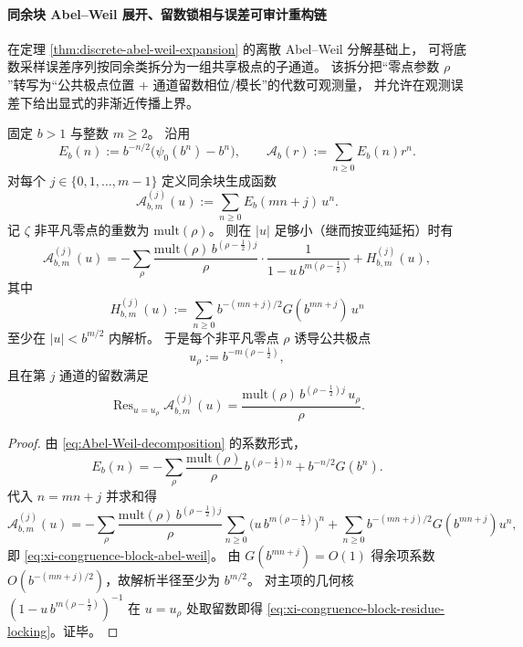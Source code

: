 \paragraph{同余块 Abel--Weil 展开、留数锁相与误差可审计重构链}\label{par:xi-discrete-abel-weil-congruence-residue-locking-audit}
在定理 \ref{thm:discrete-abel-weil-expansion} 的离散 Abel--Weil 分解基础上，
可将底数采样误差序列按同余类拆分为一组共享极点的子通道。
该拆分把“零点参数 \(\rho\)”转写为“公共极点位置 + 通道留数相位/模长”的代数可观测量，
并允许在观测误差下给出显式的非渐近传播上界。

\begin{theorem}\label{thm:xi-congruence-block-abel-weil-residue-locking}
固定 \(b>1\) 与整数 \(m\ge 2\)。
沿用
\[
E_b(n):=b^{-n/2}\bigl(\psi_0(b^n)-b^n\bigr),
\qquad
\mathcal A_b(r):=\sum_{n\ge 0}E_b(n)r^n.
\]
对每个 \(j\in\{0,1,\dots,m-1\}\) 定义同余块生成函数
\[
\mathcal A_{b,m}^{(j)}(u):=\sum_{n\ge 0}E_b(mn+j)\,u^n.
\]
记 \(\zeta\) 非平凡零点的重数为 \(\mathrm{mult}(\rho)\)。
则在 \(|u|\) 足够小（继而按亚纯延拓）时有
\begin{equation}\label{eq:xi-congruence-block-abel-weil}
\mathcal A_{b,m}^{(j)}(u)
=-\sum_{\rho}\frac{\mathrm{mult}(\rho)\,b^{(\rho-\frac12)j}}{\rho}\cdot
\frac{1}{1-u\,b^{m(\rho-\frac12)}}
+H_{b,m}^{(j)}(u),
\end{equation}
其中
\[
H_{b,m}^{(j)}(u):=\sum_{n\ge 0}b^{-(mn+j)/2}G(b^{mn+j})\,u^n
\]
至少在 \(|u|<b^{m/2}\) 内解析。
于是每个非平凡零点 \(\rho\) 诱导公共极点
\[
u_\rho:=b^{-m(\rho-\frac12)},
\]
且在第 \(j\) 通道的留数满足
\begin{equation}\label{eq:xi-congruence-block-residue-locking}
\operatorname{Res}_{u=u_\rho}\mathcal A_{b,m}^{(j)}(u)
=\frac{\mathrm{mult}(\rho)\,b^{(\rho-\frac12)j}\,u_\rho}{\rho}.
\end{equation}
\end{theorem}

\begin{proof}
由 \eqref{eq:Abel-Weil-decomposition} 的系数形式，
\[
E_b(n)= -\sum_\rho \frac{\mathrm{mult}(\rho)}{\rho}\,b^{(\rho-\frac12)n}
+b^{-n/2}G(b^n).
\]
代入 \(n=mn+j\) 并求和得
\[
\mathcal A_{b,m}^{(j)}(u)
=-\sum_\rho \frac{\mathrm{mult}(\rho)\,b^{(\rho-\frac12)j}}{\rho}
\sum_{n\ge 0}\bigl(u\,b^{m(\rho-\frac12)}\bigr)^n
+\sum_{n\ge 0}b^{-(mn+j)/2}G(b^{mn+j})u^n,
\]
即 \eqref{eq:xi-congruence-block-abel-weil}。
由 \(G(b^{mn+j})=O(1)\) 得余项系数 \(O(b^{-(mn+j)/2})\)，故解析半径至少为 \(b^{m/2}\)。
对主项的几何核
\(
(1-u\,b^{m(\rho-\frac12)})^{-1}
\)
在 \(u=u_\rho\) 处取留数即得 \eqref{eq:xi-congruence-block-residue-locking}。证毕。
\end{proof}

